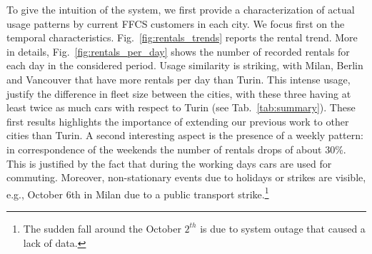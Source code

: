 To give the intuition of the system, we first provide a characterization of actual usage patterns by current FFCS customers in each city. We focus first on the temporal characteristics.
Fig.~\ref{fig:rentals_trends} reports the rental trend. More in details, Fig.~\ref{fig:rentals_per_day} shows the number of recorded rentals for each day in the considered period. Usage similarity is striking, with Milan, Berlin and Vancouver that have more rentals per day than Turin. This intense usage, justify the difference in fleet size between the cities, with these three having at least twice as much cars with respect to Turin (see Tab.~\ref{tab:summary}). These first results highlights the importance of extending our previous work to other cities than Turin. A second interesting aspect is the presence of a weekly pattern: in correspondence of the weekends the number of rentals drops of about 30\%. This is justified by the fact that during the working days cars are used for commuting. Moreover, non-stationary events due to holidays or strikes are visible, e.g., October 6th in Milan due to a public transport strike.\footnote{The sudden fall around the October $2^{th}$ is due to system outage that caused a lack of data.} 

